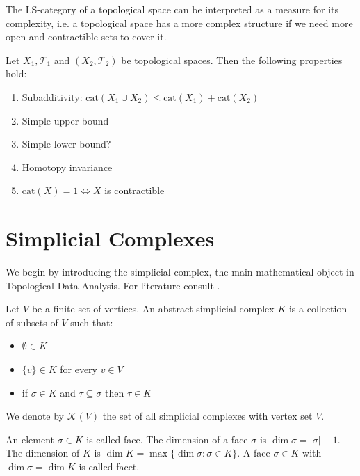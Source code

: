 The LS-category of a topological space can be interpreted as a measure for its complexity, i.e. a topological space has a more complex structure if we need more open and contractible sets to cover it.

\begin{Prop}
    Let $X_1,\mathcal{T}_1$ and $(X_2,\mathcal{T}_2)$ be topological spaces. Then the following properties hold:
    \begin{enumerate}
        \item[1.] Subadditivity: $\text{cat}(X_1\cup X_2)\le\text{cat}(X_1)+\text{cat}(X_2)$
        \item[2.] Simple upper bound
        \item[3.] Simple lower bound?
        \item[4.] Homotopy invariance
        \item[5.] $\text{cat}(X)=1\iff X$ is contractible
    \end{enumerate}
\end{Prop}



\section{Simplicial Complexes}

We begin by introducing the simplicial complex, the main mathematical object in Topological Data Analysis. For literature consult \cite{Dey_Wang_2022}.

\begin{Def}
    Let $V$ be a finite set of vertices. An abstract simplicial complex $K$ is a collection of subsets of $V$ such that:
    \begin{itemize}
        \item $\emptyset\in K$
        \item $\{v\}\in K$ for every $v\in V$
        \item if $\sigma\in K$ and $\tau\subseteq\sigma$ then $\tau\in K$
    \end{itemize}
    We denote by $\mathcal{K}(V)$ the set of all simplicial complexes with vertex set $V$.
\end{Def}

An element $\sigma\in K$ is called face. The dimension of a face $\sigma$ is $\dim{\sigma}=|\sigma|-1$. The dimension of $K$ is $\dim{K}=\max\{\dim{\sigma}:\sigma\in K\}$. A face $\sigma\in K$ with $\dim{\sigma}=\dim{K}$ is called facet.

